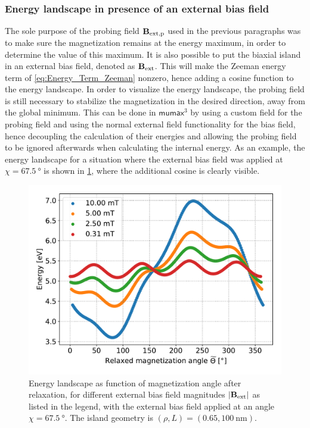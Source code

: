 \documentclass[11pt,a4paper,english,twoside]{article}
\newcommand{\mumax}{$\mathsf{mumax}^3$}
\begin{document}
\subsubsection{Energy landscape in presence of an external bias field}
The sole purpose of the probing field $\vb{B_\mathrm{ext,p}}$ used in the previous paragraphs was to make sure the magnetization remains at the energy maximum, in order to determine the value of this maximum. It is also possible to put the biaxial island in an external bias field, denoted as $\vb{B_\mathrm{ext}}$. This will make the Zeeman energy term of \cref{eq:Energy_Term_Zeeman} nonzero, hence adding a cosine function to the energy landscape. In order to visualize the energy landscape, the probing field is still necessary to stabilize the magnetization in the desired direction, away from the global minimum. This can be done in \mumax{} by using a custom field for the probing field and using the normal external field functionality for the bias field, hence decoupling the calculation of their energies and allowing the probing field to be ignored afterwards when calculating the internal energy. As an example, the energy landscape for a situation where the external bias field was applied at $\chi=\SI{67.5}{\degree}$ is shown in \cref{fig:barrierLandscape_extField}, where the additional cosine is clearly visible.
\begin{figure}[b!]
    \centering
    \includegraphics[width=0.9\columnwidth]{Figures/biaxial_island/BarrierLandscape/Ext_K0.1Ms2_Bext1e-2-1e-4_a3Pi8.pdf}
    \caption{Energy landscape as function of magnetization angle after relaxation, for different external bias field magnitudes $\abs{\vb{B_\mathrm{ext}}}$ as listed in the legend, with the external bias field applied at an angle $\chi=\SI{67.5}{\degree}$. The island geometry is $(\rho,L)=(0.65,\SI{100}{\nano\metre})$.}
    \label{fig:barrierLandscape_extField}
\end{figure}
\end{document}
